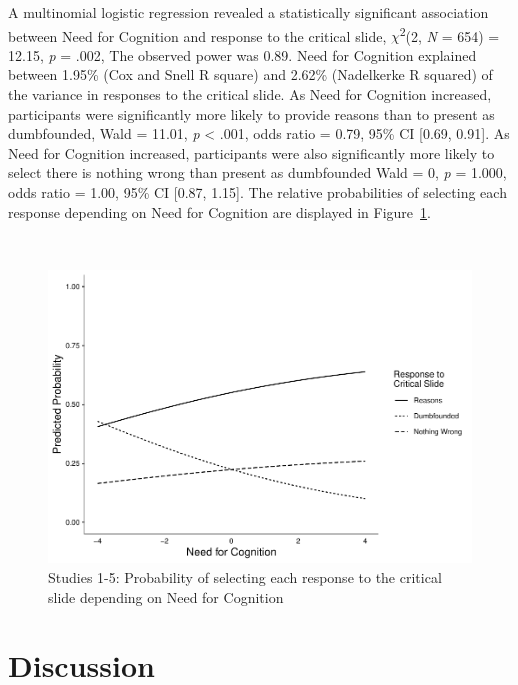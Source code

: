 \documentclass[
  american,
  man,floatsintext]{apa7}
\begin{document}
\newpage

A multinomial logistic regression revealed a statistically significant association between Need for Cognition and response to the critical slide, \(\chi\)\textsuperscript{2}(2, \emph{N} = 654) = 12.15, \emph{p} = .002, The observed
power was 0.89. Need for Cognition explained between 1.95\% (Cox and Snell R square) and 2.62\% (Nadelkerke R squared) of the variance in responses to the critical slide. As Need for Cognition increased, participants were significantly more likely to provide reasons than to present as dumbfounded, Wald = 11.01, \emph{p} \textless{} .001, odds ratio = 0.79, 95\% CI {[}0.69, 0.91{]}. As Need for Cognition increased, participants were also significantly more likely to select there is nothing wrong than present as dumbfounded Wald = 0, \emph{p} = 1.000, odds ratio = 1.00, 95\% CI {[}0.87, 1.15{]}. The relative probabilities of selecting each response depending on Need for Cognition are displayed in Figure~\ref{fig:ggplotlogitall}.

\newpage

~

\begin{figure}
\centering
\includegraphics{cog_load_in_chunks_files/figure-latex/ggplotlogitall-1.pdf}
\caption{\label{fig:ggplotlogitall}Studies 1-5: Probability of selecting each response to the critical slide depending on Need for Cognition}
\end{figure}

\newpage

\newpage

\hypertarget{discussion}{%
\section{Discussion}\label{discussion}}
\end{document}
